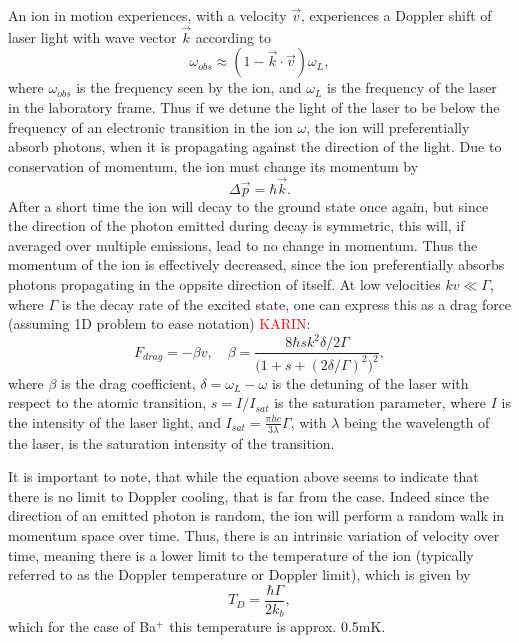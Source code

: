 An ion in motion experiences, with a velocity $\vec{v}$, experiences a Doppler shift of laser light with wave vector $\vec{k}$ according to
\begin{equation}
    \omega_{obs} \approx (1-\vec{k}\cdot\vec{v})\omega_L,
\end{equation}
where $\omega_{obs}$ is the frequency seen by the ion, and $\omega_L$ is the frequency of the laser in the laboratory frame.
Thus if we detune the light of the laser to be below the frequency of an electronic transition in the ion $\omega$, the ion will preferentially absorb photons, when it is propagating against the direction of the light.
Due to conservation of momentum, the ion must change its momentum by
\begin{equation}
    \Delta\vec{p} = \hbar\vec{k}.
\end{equation}
After a short time the ion will decay to the ground state once again, but since the direction of the photon emitted during decay is symmetric, this will, if averaged over multiple emissions, lead to no change in momentum.
Thus the momentum of the ion is effectively decreased, since the ion preferentially absorbs photons propagating in the oppsite direction of itself. At low velocities $kv\ll\Gamma$, where $\Gamma$ is the decay rate of the excited state, one can express this as a drag force (assuming 1D problem to ease notation) \textcolor{red}{KARIN}:
\begin{equation}
    F_{drag} = -\beta v,\quad \beta = \frac{8\hbar s k^2\delta / 2\Gamma}{\big(1+s+(2\delta/\Gamma)^2\big)^2},
\end{equation}
where $\beta$ is the drag coefficient, $\delta = \omega_L-\omega$ is the detuning of the laser with respect to the atomic transition, $s = I/I_{sat}$ is the saturation parameter, where $I$ is the intensity of the laser light, and $I_{sat} = \frac{\pi hc}{3\lambda}\Gamma$, with $\lambda$ being the wavelength of the laser, is the saturation intensity of the transition. 

It is important to note, that while the equation above seems to indicate that there is no limit to Doppler cooling, that is far from the case. Indeed since the direction of an emitted photon is random, the ion will perform a random walk in momentum space over time.
Thus, there is an intrinsic variation of velocity over time, meaning there is a lower limit to the temperature of the ion (typically referred to as the Doppler temperature or Doppler limit), which is given by
\begin{equation}
    T_D = \frac{\hbar\Gamma}{2k_b}\label{eq:DopplerTemp},
\end{equation}
which for the case of Ba$^+$ this temperature is approx. 0.5mK.

